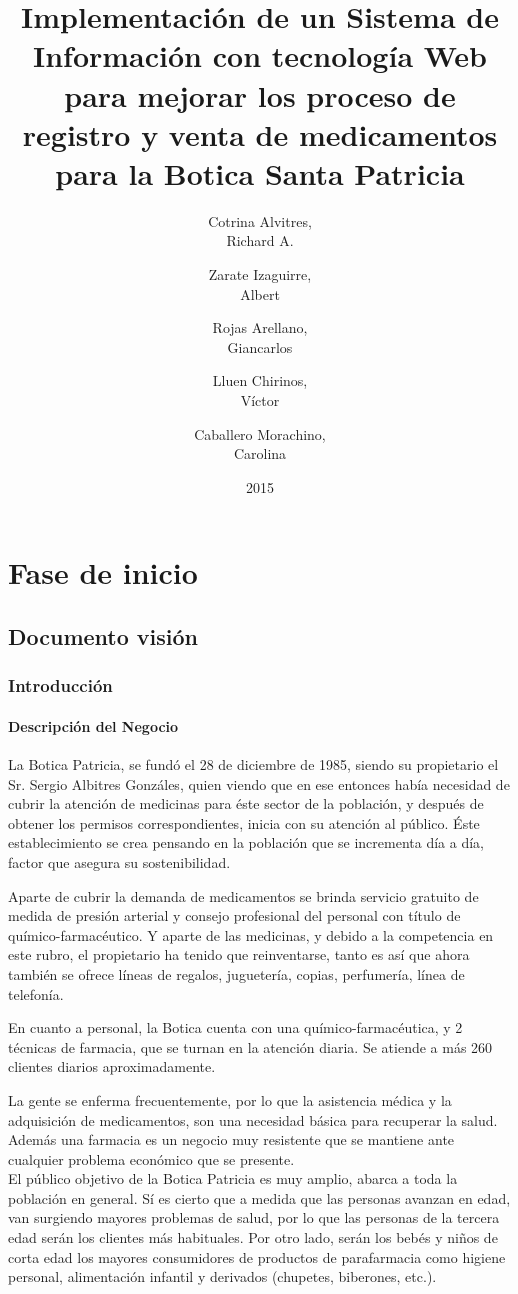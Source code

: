 \documentclass[a4paper,11pt, spanish]{report}
\title{\Huge \textbf{Implementación de un Sistema de Información con tecnología Web para mejorar los proceso de registro y venta de medicamentos para la Botica Santa Patricia\\[3em]}}
\author{
  \Large Cotrina Alvitres,\\
  Richard A.\\[2em]
  \and
  \Large Zarate Izaguirre, \\
  Albert\\[2em]
  \and
  \Large Rojas Arellano, \\
  Giancarlos\\[2em]
  \and
  \Large Lluen Chirinos, \\
  Víctor\\[2em]
  \and
  \Large Caballero Morachino,\\
  Carolina\\[2em]
}
\date{\LARGE 2015}
\begin{document}
\maketitle

\tableofcontents
\listoftables
\listoffigures

\part{Fase de inicio}
  \chapter{Documento visión}
    \section{Introducción}
      \subsection{Descripción del Negocio}
        La Botica Patricia, se fundó el 28 de diciembre de 1985, siendo su propietario el Sr. Sergio Albitres Gonzáles, quien viendo que en ese entonces había necesidad de cubrir la atención de medicinas para éste sector de la población, y después de obtener los permisos correspondientes, inicia con su atención al público.         
Éste establecimiento se crea pensando en la población que se incrementa día a día, factor que asegura su sostenibilidad.

Aparte de cubrir la demanda de medicamentos se brinda servicio gratuito de medida de presión arterial y consejo profesional del personal con título de químico-farmacéutico. Y aparte de las medicinas, y debido a la competencia en este rubro, el propietario ha tenido que reinventarse, tanto es así que ahora también se ofrece líneas de regalos, juguetería, copias, perfumería, línea de telefonía.

En cuanto a personal, la Botica cuenta con una químico-farmacéutica, y 2 técnicas de farmacia, que se turnan en la atención diaria. Se atiende a más 260 clientes diarios aproximadamente.

La gente se enferma frecuentemente, por lo que la asistencia médica y la adquisición de medicamentos, son una necesidad básica para recuperar la salud. Además una farmacia es un negocio muy resistente que se mantiene ante cualquier problema económico que se presente. \\
El público objetivo de la Botica Patricia es muy amplio, abarca a toda la población en general. Sí es cierto que a medida que las personas avanzan en edad, van surgiendo mayores problemas de salud, por lo que las personas de la tercera edad serán los clientes más habituales.
Por otro lado, serán los bebés y niños de corta edad los mayores consumidores de productos de parafarmacia como higiene personal, alimentación infantil y derivados (chupetes, biberones, etc.).
\end{document}
